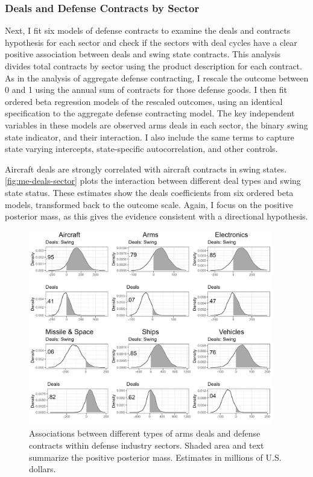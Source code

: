 \documentclass[12pt]{article}
\begin{document}

\subsubsection{Deals and Defense Contracts by Sector}


Next, I fit six models of defense contracts to examine the deals and contracts hypothesis for each sector and check if the sectors with deal cycles have a clear positive association between deals and swing state contracts. 
This analysis divides total contracts by sector using the product description for each contract. 
As in the analysis of aggregate defense contracting, I rescale the outcome between 0 and 1 using the annual sum of contracts for those defense goods. 
I then fit ordered beta regression models of the rescaled outcomes, using an identical specification to the aggregate defense contracting model.
The key independent variables in these models are observed arms deals in each sector, the binary swing state indicator, and their interaction. 
I also include the same terms to capture state varying intercepts, state-specific autocorrelation, and other controls. 


Aircraft deals are strongly correlated with aircraft contracts in swing states. 
\autoref{fig:me-deals-sector} plots the interaction between different deal types and swing state status.  
These estimates show the deals coefficients from six ordered beta models, transformed back to the outcome scale. 
Again, I focus on the positive posterior mass, as this gives the evidence consistent with a directional hypothesis.


\begin{figure}[htpb]
	\centering
		\includegraphics[width=0.95\textwidth]{../figures/me-deals-sector.png}
	\caption{Associations between different types of arms deals and defense contracts within defense industry sectors. Shaded area and text summarize the positive posterior mass. Estimates in millions of U.S. dollars.}
	\label{fig:me-deals-sector}
\end{figure}
\end{document}
